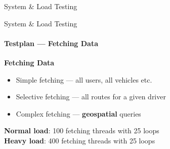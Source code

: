 \begin{frame}{System \& Load Testing}
{\begin{figure}[htb]
        \end{figure}
    }
\end{frame}


\begin{frame}{System \& Load Testing}
    \framesubtitle{Testplan --- Fetching Data}
    \textbf{Fetching Data}
    \begin{itemize}
        \item Simple fetching --- all users, all vehicles etc.
        \item Selective fetching --- all routes for a given driver
        \item Complex fetching --- \textbf{geospatial} queries
    \end{itemize}
    \textbf{Normal load}: 100 fetching threads with 25 loops\\
    \textbf{Heavy load}: 400 fetching threads with 25 loops
\end{frame}
